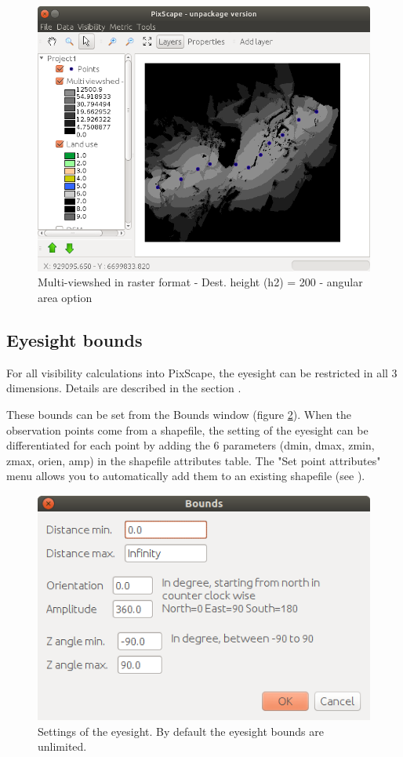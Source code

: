 \documentclass{report}
\begin{document}
\begin{figure}[H]
	\includegraphics[scale=0.5]{img/multi_viewshed_raster_deg-en.png} 
	\caption{Multi-viewshed in raster format - Dest. height (h2) = 200 - angular area option}
	\label{multi_viewshed_raster_deg}
\end{figure}

\subsection{Eyesight bounds}
\label{bounds_ui}
For all visibility calculations into PixScape, the eyesight can be restricted in all 3 dimensions. Details are described in the section .

These bounds can be set from the Bounds window (figure \ref{bounds_dlg}). When the observation points come from a shapefile, the setting of the eyesight can be differentiated for each point by adding the 6 parameters (dmin, dmax, zmin, zmax, orien, amp) in the shapefile attributes table. The "Set point attributes" menu allows you to automatically add them to an existing shapefile (see ).

\begin{figure}[H]
	\includegraphics[scale=0.5]{img/bounds-en.png} 
	\caption{Settings of the eyesight. By default the eyesight bounds are unlimited.}
	\label{bounds_dlg}
\end{figure}
\end{document}
